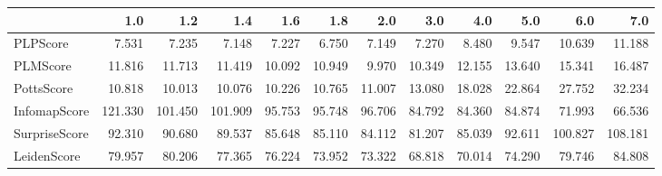 \begin{tabular}{lrrrrrrrrrrr}
\toprule
{} &     1.0 &     1.2 &     1.4 &    1.6 &    1.8 &    2.0 &    3.0 &    4.0 &    5.0 &     6.0 &     7.0 \\
\midrule
PLPScore      &   7.531 &   7.235 &   7.148 &  7.227 &  6.750 &  7.149 &  7.270 &  8.480 &  9.547 &  10.639 &  11.188 \\
PLMScore      &  11.816 &  11.713 &  11.419 & 10.092 & 10.949 &  9.970 & 10.349 & 12.155 & 13.640 &  15.341 &  16.487 \\
PottsScore    &  10.818 &  10.013 &  10.076 & 10.226 & 10.765 & 11.007 & 13.080 & 18.028 & 22.864 &  27.752 &  32.234 \\
InfomapScore  & 121.330 & 101.450 & 101.909 & 95.753 & 95.748 & 96.706 & 84.792 & 84.360 & 84.874 &  71.993 &  66.536 \\
SurpriseScore &  92.310 &  90.680 &  89.537 & 85.648 & 85.110 & 84.112 & 81.207 & 85.039 & 92.611 & 100.827 & 108.181 \\
LeidenScore   &  79.957 &  80.206 &  77.365 & 76.224 & 73.952 & 73.322 & 68.818 & 70.014 & 74.290 &  79.746 &  84.808 \\
\bottomrule
\end{tabular}
